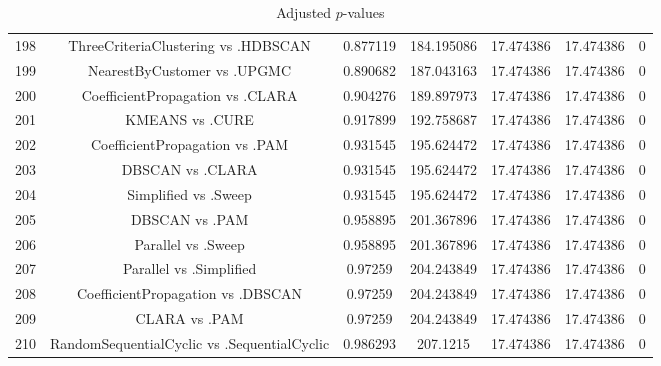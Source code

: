 \documentclass[a4paper,10pt]{article}
\begin{document}
\begin{landscape}
\begin{table}[!htp]
\begin{tabular}{ccccccc}
198&ThreeCriteriaClustering vs .HDBSCAN&0.877119&184.195086&17.474386&17.474386&0\\
199&NearestByCustomer vs .UPGMC&0.890682&187.043163&17.474386&17.474386&0\\
200&CoefficientPropagation vs .CLARA&0.904276&189.897973&17.474386&17.474386&0\\
201&KMEANS vs .CURE&0.917899&192.758687&17.474386&17.474386&0\\
202&CoefficientPropagation vs .PAM&0.931545&195.624472&17.474386&17.474386&0\\
203&DBSCAN vs .CLARA&0.931545&195.624472&17.474386&17.474386&0\\
204&Simplified vs .Sweep&0.931545&195.624472&17.474386&17.474386&0\\
205&DBSCAN vs .PAM&0.958895&201.367896&17.474386&17.474386&0\\
206&Parallel vs .Sweep&0.958895&201.367896&17.474386&17.474386&0\\
207&Parallel vs .Simplified&0.97259&204.243849&17.474386&17.474386&0\\
208&CoefficientPropagation vs .DBSCAN&0.97259&204.243849&17.474386&17.474386&0\\
209&CLARA vs .PAM&0.97259&204.243849&17.474386&17.474386&0\\
210&RandomSequentialCyclic vs .SequentialCyclic&0.986293&207.1215&17.474386&17.474386&0\\
\hline
\end{tabular}
\caption{Adjusted $p$-values}
\end{table}

\end{landscape}
\end{document}
